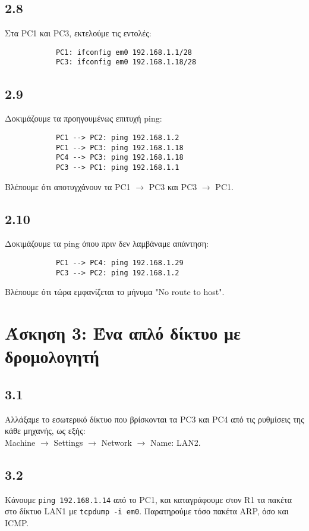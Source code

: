 \documentclass[a4paper, 12pt]{article}
\begin{document}
	\subsection*{2.8}
		Στα PC1 και PC3, εκτελούμε τις εντολές:
		
		\begin{verbatim}
			PC1: ifconfig em0 192.168.1.1/28 
			PC3: ifconfig em0 192.168.1.18/28
		\end{verbatim}  
		
	\subsection*{2.9}
		Δοκιμάζουμε τα προηγουμένως επιτυχή ping: 
		
		\begin{verbatim}
			PC1 --> PC2: ping 192.168.1.2
			PC1 --> PC3: ping 192.168.1.18 
			PC4 --> PC3: ping 192.168.1.18 
			PC3 --> PC1: ping 192.168.1.1
		\end{verbatim}
		
		Βλέπουμε ότι αποτυγχάνουν τα PC1 $\rightarrow$ PC3 και PC3 $\rightarrow$ PC1.

	\subsection*{2.10}
		Δοκιμάζουμε τα ping όπου πριν δεν λαμβάναμε απάντηση:
		
		\begin{verbatim}
			PC1 --> PC4: ping 192.168.1.29
			PC3 --> PC2: ping 192.168.1.2
		\end{verbatim}
		
		Βλέπουμε ότι τώρα εμφανίζεται το μήνυμα "No route to host".

\section*{Άσκηση 3: Ένα απλό δίκτυο με δρομολογητή}

	\subsection*{3.1}
		Αλλάξαμε το εσωτερικό δίκτυο που βρίσκονται τα PC3 και PC4 από τις ρυθμίσεις της κάθε μηχανής, ως εξής: \\
		
		Machine $\rightarrow$ Settings $\rightarrow$ Network $\rightarrow$ Name: LAN2.

	\subsection*{3.2}
		Κάνουμε \verb|ping 192.168.1.14| από το PC1, και καταγράφουμε στον R1 τα πακέτα στο δίκτυο LAN1 με \verb|tcpdump -i em0|. Παρατηρούμε τόσο πακέτα ARP, όσο και ICMP.
\end{document}
